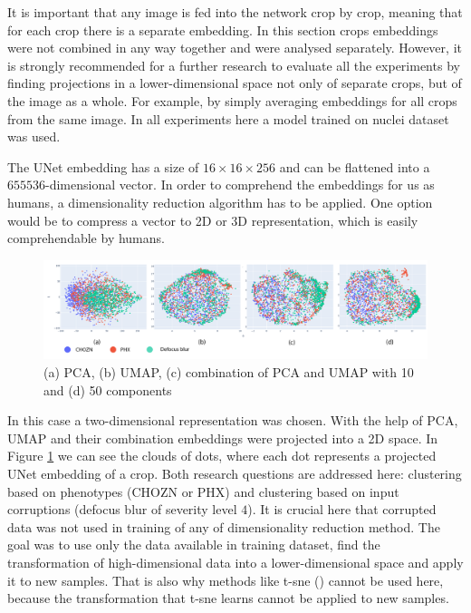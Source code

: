 It is important that any image is fed into the network crop by crop, meaning that for each crop there is a separate embedding. In this section crops embeddings were not combined in any way together and were analysed separately. However, it is strongly recommended for a further research to evaluate all the experiments by finding projections in a lower-dimensional space not only of separate crops, but of the image as a whole. For example, by simply averaging embeddings for all crops from the same image. In all experiments here a model trained on nuclei dataset was used.

The UNet embedding has a size of $16 \times 16 \times 256$ and can be flattened into a $655536$-dimensional vector. In order to comprehend the embeddings for us as humans, a dimensionality reduction algorithm has to be applied. One option would be to compress a vector to 2D or 3D representation, which is easily comprehendable by humans.
\begin{figure}[htb]
	\includegraphics[width=\linewidth]{bilder/unet-embeddings/umap-pca-embeddings.png}
	\caption{(a) PCA, (b) UMAP, (c) combination of PCA and UMAP with 10 and (d) 50 components}\label{fig:umap-pca-embeddings}
\end{figure}

In this case a two-dimensional representation was chosen. With the help of PCA, UMAP and their combination embeddings were projected into a 2D space. In Figure \ref{fig:umap-pca-embeddings} we can see the clouds of dots, where each dot represents a projected UNet embedding of a crop. Both research questions are addressed here: clustering based on phenotypes (CHOZN or PHX) and clustering based on input corruptions (defocus blur of severity level $4$). It is crucial here that corrupted data was not used in training of any of dimensionality reduction method. The goal was to use only the data available in training dataset, find the transformation of high-dimensional data into a lower-dimensional space and apply it to new samples. That is also why methods like t-sne (\cite{t-sne}) cannot be used here, because the transformation that t-sne learns cannot be applied to new samples. 

